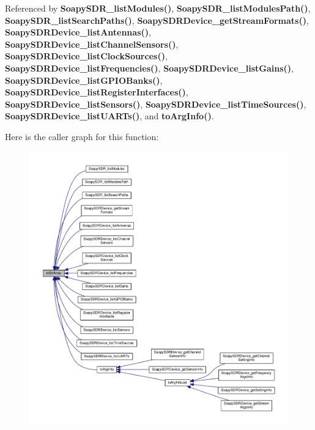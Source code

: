 Referenced by {\bf Soapy\+S\+D\+R\+\_\+list\+Modules()}, {\bf Soapy\+S\+D\+R\+\_\+list\+Modules\+Path()}, {\bf Soapy\+S\+D\+R\+\_\+list\+Search\+Paths()}, {\bf Soapy\+S\+D\+R\+Device\+\_\+get\+Stream\+Formats()}, {\bf Soapy\+S\+D\+R\+Device\+\_\+list\+Antennas()}, {\bf Soapy\+S\+D\+R\+Device\+\_\+list\+Channel\+Sensors()}, {\bf Soapy\+S\+D\+R\+Device\+\_\+list\+Clock\+Sources()}, {\bf Soapy\+S\+D\+R\+Device\+\_\+list\+Frequencies()}, {\bf Soapy\+S\+D\+R\+Device\+\_\+list\+Gains()}, {\bf Soapy\+S\+D\+R\+Device\+\_\+list\+G\+P\+I\+O\+Banks()}, {\bf Soapy\+S\+D\+R\+Device\+\_\+list\+Register\+Interfaces()}, {\bf Soapy\+S\+D\+R\+Device\+\_\+list\+Sensors()}, {\bf Soapy\+S\+D\+R\+Device\+\_\+list\+Time\+Sources()}, {\bf Soapy\+S\+D\+R\+Device\+\_\+list\+U\+A\+R\+Ts()}, and {\bf to\+Arg\+Info()}.



Here is the caller graph for this function\+:
\nopagebreak
\begin{figure}[H]
\begin{center}
\leavevmode
\includegraphics[width=350pt]{d9/dec/TypeHelpers_8hpp_a265d3b5d0022b49faa0adafb0b1c1c5c_icgraph}
\end{center}
\end{figure}


